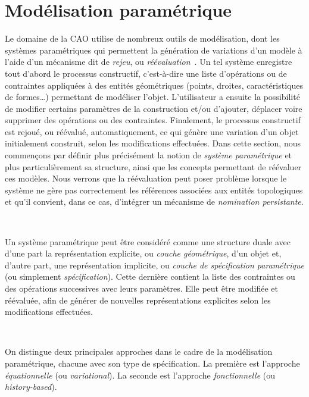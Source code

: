 \section[Modélisation paramétrique]{Modélisation paramétrique}
\label{sec:etat-art-modelisation-parametrique}

Le domaine de la CAO utilise de nombreux outils de modélisation, dont les
systèmes paramétriques qui permettent la génération de variations d'un modèle à
l'aide d'un mécanisme dit de \textit{rejeu}, ou
\textit{réévaluation}~\cite{dassaultCATIA,dassaultSOLIDWORKS,autodeskAUTOCAD,autodeskREVIT,siemensNX}. %
Un tel système enregistre tout d'abord le processus constructif, c'est-à-dire
une liste d'opérations ou de contraintes appliquées à des entités géométriques
(points, droites, caractéristiques de formes\dots) permettant de modéliser
l'objet. %
L'utilisateur a ensuite la possibilité de modifier certains paramètres de la
construction et/ou d'ajouter, déplacer voire supprimer des opérations ou des
contraintes. %
Finalement, le processus constructif est rejoué, ou réévalué, automatiquement, ce qui
génère une variation d'un objet initialement construit, selon les modifications
effectuées. %
Dans cette section, nous commençons par définir plus précisément la notion de
\textit{système paramétrique} et plus particulièrement sa structure, ainsi que
les concepts permettant de réévaluer ces modèles. %
Nous verrons que la réévaluation peut poser problème lorsque le système ne gère
pas correctement les références associées aux entités topologiques et qu'il
convient, dans ce cas, d'intégrer un mécanisme de \textit{nomination persistante}. %

~

Un système paramétrique peut être considéré comme une structure duale avec
d'une part la représentation explicite, ou \emph{couche géométrique}, d'un
objet et, d'autre part, une représentation implicite, ou \emph{couche de spécification
	paramétrique} (ou simplement \emph{spécification}). %
Cette dernière contient la liste des contraintes ou des opérations successives
avec leurs paramètres. %
Elle peut être modifiée et réévaluée, afin de générer de nouvelles
représentations explicites selon les modifications effectuées. %

~

On distingue deux principales approches dans le cadre de la
modélisation paramétrique, chacune avec son type de
spécification. %
La première est l'approche \emph{équationnelle} (ou \emph{variational}). %
La seconde est l'approche \emph{fonctionnelle} (ou \emph{history-based}). %


